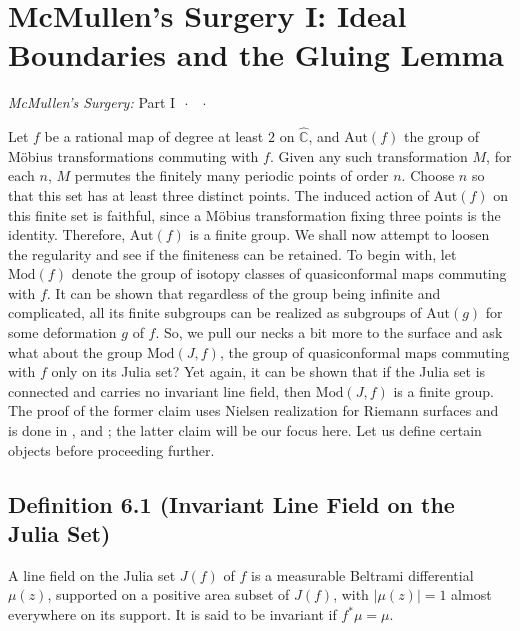 \documentclass[11pt,a4paper]{article}
\begin{document}
\section*{McMullen's Surgery I: Ideal Boundaries and the Gluing Lemma}
\begin{center}
\emph{McMullen's Surgery:} Part I \(\,\cdot\,\)
 \(\,\cdot\,\)
\end{center}

Let $f$ be a rational map of degree at least $2$ on $\hat{\mathbb{C}}$, and $\text{Aut}(f)$ the group of M\"obius transformations commuting with $f$. Given any such transformation $M$, for each $n$, $M$ permutes the finitely many periodic points of order $n$. Choose $n$ so that this set has at least three distinct points. The induced action of $\text{Aut}(f)$ on this finite set is faithful, since a M\"obius transformation fixing three points is the identity. Therefore, $\text{Aut}(f)$ is a finite group. We shall now attempt to loosen the regularity and see if the finiteness can be retained. To begin with, let $\text{Mod}(f)$ denote the group of isotopy classes of quasiconformal maps commuting with $f$. It can be shown that regardless of the group being infinite and complicated, all its finite subgroups can be realized as subgroups of $\text{Aut}(g)$ for some deformation $g$ of $f$. So, we pull our necks a bit more to the surface and ask what about the group $\text{Mod}(J, f)$, the group of quasiconformal maps commuting with $f$ only on its Julia set? Yet again, it can be shown that if the Julia set is connected and carries no invariant line field, then $\text{Mod}(J, f)$ is a finite group. The proof of the former claim uses Nielsen realization for Riemann surfaces and is done in \cite{mcmullen1988automorphisms}, \cite{mcmullen1998quasiconformal} and \cite{imayoshi2012introduction}; the latter claim will be our focus here. Let us define certain objects before proceeding further.

    \subsection*{Definition 6.1 (Invariant Line Field on the Julia Set)} A line field on the Julia set $J(f)$ of $f$ is a measurable Beltrami differential $\mu(z)$, supported on a positive area subset of $J(f)$, with $|\mu(z)|=1$ almost everywhere on its support. It is said to be invariant if $f^*\mu = \mu$.
\end{document}
